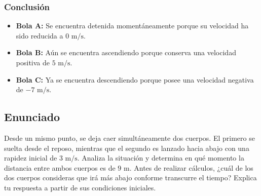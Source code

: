\documentclass[12pt, a4paper]{article}
\begin{document}
\subsubsection*{Conclusión}

\begin{itemize}
    \item \textbf{Bola A:} Se encuentra detenida momentáneamente porque su velocidad ha sido reducida a $0 \text{ m/s}$.
    \item \textbf{Bola B:} Aún se encuentra ascendiendo porque conserva una velocidad positiva de $5 \text{ m/s}$.
    \item \textbf{Bola C:} Ya se encuentra descendiendo porque posee una velocidad negativa de $-7 \text{ m/s}$.
\end{itemize}

\newpage

\subsection*{Enunciado}

Desde un mismo punto, se deja caer simultáneamente dos cuerpos. El primero se suelta desde el reposo, mientras que el segundo es lanzado hacia abajo con una rapidez inicial de $3 \text{ m/s}$. Analiza la situación y determina en qué momento la distancia entre ambos cuerpos es de $9 \text{ m}$. Antes de realizar cálculos, ¿cuál de los dos cuerpos consideras que irá más abajo conforme transcurre el tiempo? Explica tu respuesta a partir de sus condiciones iniciales.

\vspace{0.5cm}

\begin{center}
\end{center}
\end{document}
